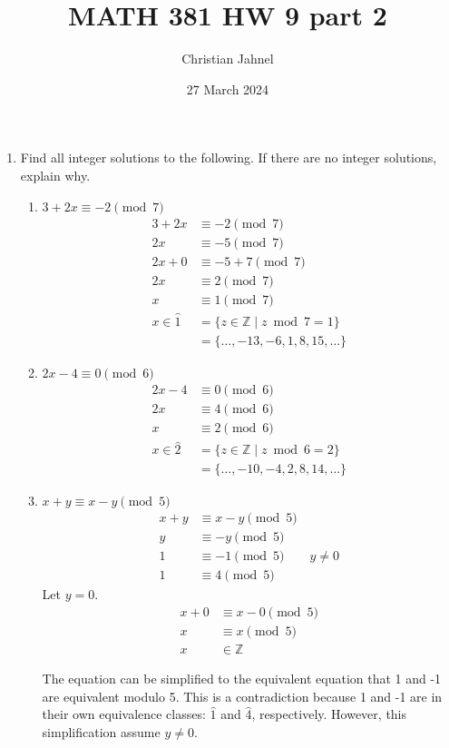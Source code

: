 \documentclass[letterpaper, 12pt]{article}
\title{MATH 381 HW 9 part 2}
\author{Christian Jahnel}
\date{27 March 2024}
\newcommand{\Z}{\mathbb{Z}}
\newcommand{\0}{\emptyset}
\begin{document}
\maketitle
\begin{enumerate}
\item Find all integer solutions to the following. If there are no integer solutions, explain why.
\begin{enumerate}
\item $3 + 2x \equiv -2 \pmod 7$
\begin{align*}
    3 + 2x &\equiv -2 \pmod 7 \\
    2x &\equiv -5 \pmod 7 \\
    2x + 0 &\equiv -5 + 7 \pmod 7 \\
    2x &\equiv 2 \pmod 7 \\
    x &\equiv 1 \pmod 7 \\
    x \in \hat{1} &= \{z \in \Z \mid z \bmod 7 = 1\} \\
    &= \{\dots, -13, -6, 1, 8, 15, \dots\}
\end{align*}
\item $2x - 4 \equiv 0 \pmod 6$
\begin{align*}
    2x - 4 &\equiv 0 \pmod 6 \\
    2x &\equiv 4 \pmod 6 \\
    x &\equiv 2 \pmod 6 \\
    x \in \hat{2} &= \{z \in \Z \mid z \bmod 6 = 2\} \\
    &= \{\dots, -10, -4, 2, 8, 14, \dots\}
\end{align*}
\item $x + y \equiv x - y \pmod 5$
\begin{align*}
    x + y &\equiv x - y \pmod 5 \\
    y &\equiv -y \pmod 5 \\
    1 &\equiv -1 \pmod 5 \qquad y \ne 0\\
    1 &\equiv 4 \pmod 5
\end{align*}
Let $y = 0$.
\begin{align*}
    x + 0 &\equiv x - 0 \pmod 5 \\
    x &\equiv x \pmod 5 \\
    x &\in \Z
\end{align*}
\begin{flushleft}
    The equation can be simplified to the equivalent equation that 1 and -1 are equivalent 
    modulo 5. This is a contradiction because 1 and -1 are in their own equivalence classes: 
    $\hat{1}$ and $\hat{4}$, respectively. However, this simplification assume $y \ne 0$. 

\end{flushleft}
\end{enumerate}
\end{enumerate}
\end{document}
